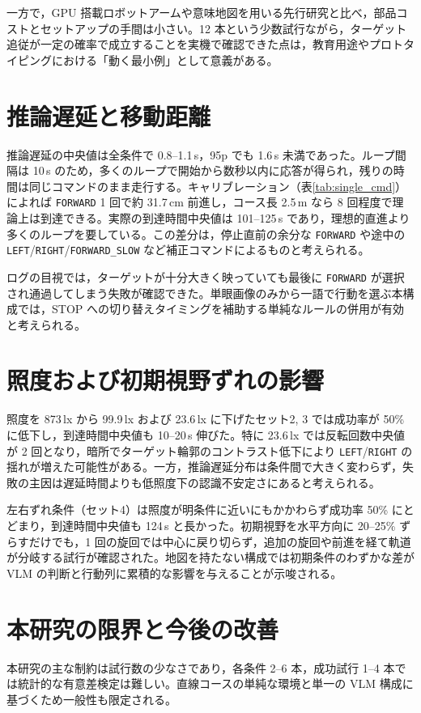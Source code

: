 \documentclass[a4paper,11pt]{ltjsreport}
\begin{document}
一方で，GPU 搭載ロボットアームや意味地図を用いる先行研究と比べ，部品コストとセットアップの手間は小さい。12 本という少数試行ながら，ターゲット追従が一定の確率で成立することを実機で確認できた点は，教育用途やプロトタイピングにおける「動く最小例」として意義がある。

\section{推論遅延と移動距離}
推論遅延の中央値は全条件で 0.8--1.1\,s，95p でも 1.6\,s 未満であった。ループ間隔は 10\,s のため，多くのループで開始から数秒以内に応答が得られ，残りの時間は同じコマンドのまま走行する。キャリブレーション（表\ref{tab:single_cmd}）によれば \texttt{FORWARD} 1 回で約 31.7\,cm 前進し，コース長 2.5\,m なら 8 回程度で理論上は到達できる。実際の到達時間中央値は 101--125\,s であり，理想的直進より多くのループを要している。この差分は，停止直前の余分な \texttt{FORWARD} や途中の \texttt{LEFT}/\texttt{RIGHT}/\texttt{FORWARD\_SLOW} など補正コマンドによるものと考えられる。

ログの目視では，ターゲットが十分大きく映っていても最後に \texttt{FORWARD} が選択され通過してしまう失敗が確認できた。単眼画像のみから一語で行動を選ぶ本構成では，STOP への切り替えタイミングを補助する単純なルールの併用が有効と考えられる。

\section{照度および初期視野ずれの影響}
照度を 873\,lx から 99.9\,lx および 23.6\,lx に下げたセット2, 3 では成功率が 50\% に低下し，到達時間中央値も 10--20\,s 伸びた。特に 23.6\,lx では反転回数中央値が 2 回となり，暗所でターゲット輪郭のコントラスト低下により \texttt{LEFT}/\texttt{RIGHT} の揺れが増えた可能性がある。一方，推論遅延分布は条件間で大きく変わらず，失敗の主因は遅延時間よりも低照度下の認識不安定さにあると考えられる。

左右ずれ条件（セット4）は照度が明条件に近いにもかかわらず成功率 50\% にとどまり，到達時間中央値も 124\,s と長かった。初期視野を水平方向に 20--25\% ずらすだけでも，1 回の旋回では中心に戻り切らず，追加の旋回や前進を経て軌道が分岐する試行が確認された。地図を持たない構成では初期条件のわずかな差が VLM の判断と行動列に累積的な影響を与えることが示唆される。

\section{本研究の限界と今後の改善}
本研究の主な制約は試行数の少なさであり，各条件 2--6 本，成功試行 1--4 本では統計的な有意差検定は難しい。直線コースの単純な環境と単一の VLM 構成に基づくため一般性も限定される。
\end{document}
